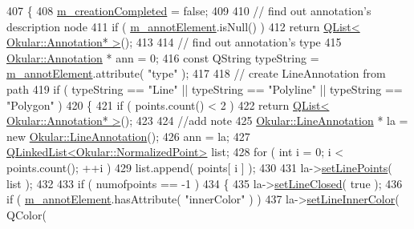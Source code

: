 \begin{DoxyCode}
407         \{
408             \hyperlink{classAnnotatorEngine_a0df119b4d87a1e3ea8ed60a96d7ff444}{m\_creationCompleted} = \textcolor{keyword}{false};
409 
410             \textcolor{comment}{// find out annotation's description node}
411             \textcolor{keywordflow}{if} ( \hyperlink{classAnnotatorEngine_ac95af6291cc2f0c601e1bbf8a5e6a0bd}{m\_annotElement}.isNull() )
412                 \textcolor{keywordflow}{return} \hyperlink{classQList}{QList< Okular::Annotation* >}();
413 
414             \textcolor{comment}{// find out annotation's type}
415             \hyperlink{classOkular_1_1Annotation}{Okular::Annotation} * ann = 0;
416             \textcolor{keyword}{const} QString typeString = \hyperlink{classAnnotatorEngine_ac95af6291cc2f0c601e1bbf8a5e6a0bd}{m\_annotElement}.attribute( \textcolor{stringliteral}{"type"} );
417 
418             \textcolor{comment}{// create LineAnnotation from path}
419             \textcolor{keywordflow}{if} ( typeString == \textcolor{stringliteral}{"Line"} || typeString == \textcolor{stringliteral}{"Polyline"} || typeString == \textcolor{stringliteral}{"Polygon"} )
420             \{
421                 \textcolor{keywordflow}{if} ( points.count() < 2 )
422                     \textcolor{keywordflow}{return} \hyperlink{classQList}{QList< Okular::Annotation* >}();
423 
424                 \textcolor{comment}{//add note}
425                 \hyperlink{classOkular_1_1LineAnnotation}{Okular::LineAnnotation} * la = \textcolor{keyword}{new} 
      \hyperlink{classOkular_1_1LineAnnotation}{Okular::LineAnnotation}();
426                 ann = la;
427                 \hyperlink{classQLinkedList}{QLinkedList<Okular::NormalizedPoint>} list;
428                 \textcolor{keywordflow}{for} ( \textcolor{keywordtype}{int} i = 0; i < points.count(); ++i )
429                     list.append( points[ i ] );
430 
431                 la->\hyperlink{classOkular_1_1LineAnnotation_a8d55187d06930ee5abe8cb0737826b9e}{setLinePoints}( list );
432 
433                 \textcolor{keywordflow}{if} ( numofpoints == -1 )
434                 \{
435                     la->\hyperlink{classOkular_1_1LineAnnotation_a7a48ad13b37252c75d3bbab59393a941}{setLineClosed}( \textcolor{keyword}{true} );
436                     \textcolor{keywordflow}{if} ( \hyperlink{classAnnotatorEngine_ac95af6291cc2f0c601e1bbf8a5e6a0bd}{m\_annotElement}.hasAttribute( \textcolor{stringliteral}{"innerColor"} ) )
437                         la->\hyperlink{classOkular_1_1LineAnnotation_ae5959ad2b144411d304ff790805f65ab}{setLineInnerColor}( QColor( 

\end{DoxyCode}
